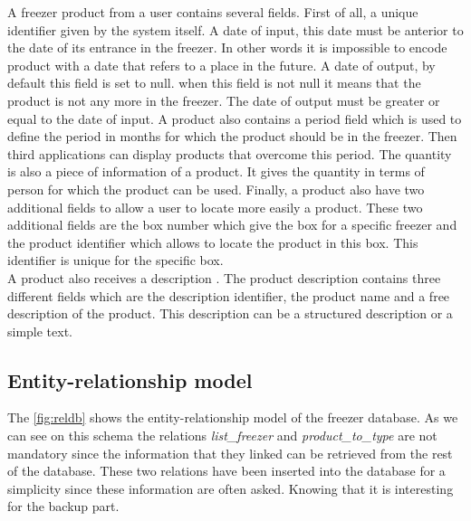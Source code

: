 A freezer product from a user contains several fields. First of all, a unique identifier given by the system itself. A date of input, this date must be anterior to the date of its entrance in the freezer. In other words it is impossible to encode product with a date that refers to a place in the future. A date of output, by default this field is set to null. when this field is not null it means that the product is not any more in the freezer. The date of output must be greater or equal to the date of input. A product also contains a period field which is used to define the period in months for which the product should be in the freezer. Then third applications can display products that overcome this period. The quantity is also a piece of information of a product. It gives  the quantity in terms of person for which the product can be used. Finally, a product also have two additional fields to allow a user to locate more easily a product. These two additional fields are the box number which give the box for a specific freezer and the product identifier which allows to locate the product in this box. This identifier is unique for the specific box. \\

A product also receives a description . The product description contains three different fields which are the description identifier, the product name and a free description of the product. This description can be a structured description or a simple text. \\

\subsection{Entity-relationship model}
The \autoref{fig:reldb} shows the entity-relationship model of the freezer database. As we can see on this schema the relations \textit{list\_freezer} and \textit{product\_to\_type} are not mandatory since the information that they linked can be retrieved from the rest of the database. These two relations have been inserted into the database for a simplicity since these information are often asked. Knowing that it is interesting for the backup part. \\

